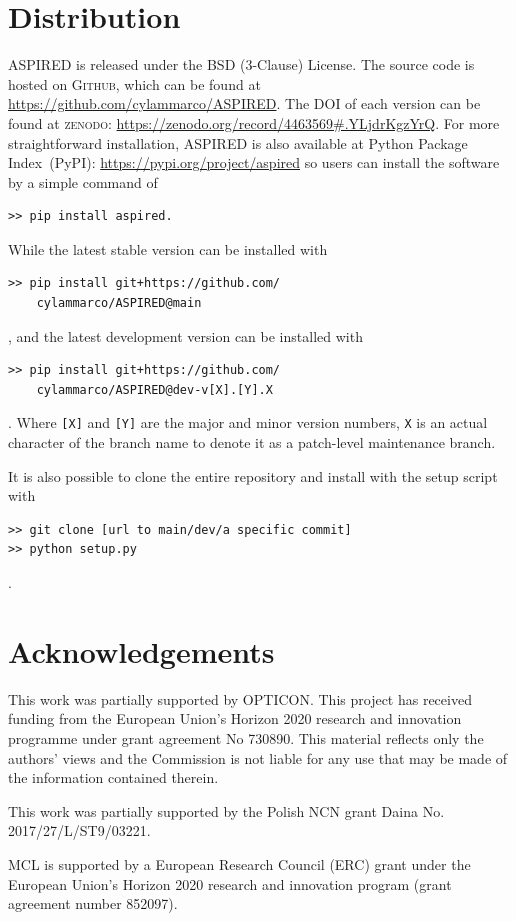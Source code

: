 \documentclass[twocolumn, linenumbers]{aastex631}
\begin{document}
\section{Distribution}
\textsc{ASPIRED} is released under the BSD (3-Clause) License. The
source code is hosted on \textsc{Github}, which can be found at
\url{https://github.com/cylammarco/ASPIRED}. The DOI of each version
can be found at \textsc{zenodo}: \url{https://zenodo.org/record/4463569#.YLjdrKgzYrQ}.
For more straightforward installation, \textsc{ASPIRED} is also available at Python
Package Index~(PyPI): \url{https://pypi.org/project/aspired} so
users can install the software by a simple command of 
\begin{verbatim}
>> pip install aspired.
\end{verbatim}
While the latest stable version can be installed with
\begin{verbatim}
>> pip install git+https://github.com/
    cylammarco/ASPIRED@main
\end{verbatim},
and the latest development version can be installed with 
\begin{verbatim}
>> pip install git+https://github.com/
    cylammarco/ASPIRED@dev-v[X].[Y].X
\end{verbatim}. Where \verb+[X]+ and \verb+[Y]+ are the major and minor version numbers,
\verb+X+ is an actual character of the branch name to denote it as a patch-level maintenance
branch.

It is also possible to clone the entire repository
and install with the setup script with
\begin{verbatim}
>> git clone [url to main/dev/a specific commit]
>> python setup.py
\end{verbatim}
.

\section*{Acknowledgements}
This work was partially supported by OPTICON. This project has
received funding from the European Union's Horizon 2020 research and
innovation programme under grant agreement No 730890. This material
reflects only the authors' views and the Commission is not liable for
any use that may be made of the information contained therein.

This work was partially supported by the Polish NCN grant Daina
No. 2017/27/L/ST9/03221.

MCL is supported by a European Research Council (ERC) grant under the European Union's Horizon 2020 research and innovation program (grant agreement number 852097).
\end{document}
